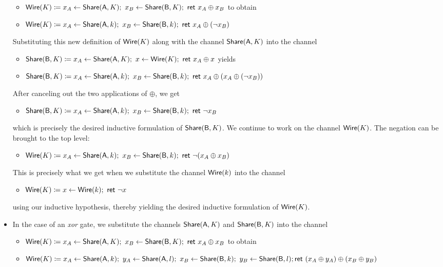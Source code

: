 \begin{itemize}
\begin{itemize}
\item $\mathsf{Wire}(K) \coloneqq x_A \leftarrow \mathsf{Share}(\mathsf{A},K); \ x_B \leftarrow \mathsf{Share}(\mathsf{B},K); \ \mathsf{ret} \ x_A \oplus x_B$ to obtain 
\item $\mathsf{Wire}(K) \coloneqq x_A \leftarrow \mathsf{Share}(\mathsf{A},k); \ x_B \leftarrow \mathsf{Share}(\mathsf{B},k); \ \mathsf{ret} \ x_A \oplus (\neg x_B)$
\end{itemize}
Substituting this new definition of $\mathsf{Wire}(K)$ along with the channel $\mathsf{Share}(\mathsf{A},K)$ into the channel
\begin{itemize}
\item $\mathsf{Share}(\mathsf{B},K) \coloneqq x_A \leftarrow \mathsf{Share}(\mathsf{A},K); \ x \leftarrow \mathsf{Wire}(K); \ \mathsf{ret} \ x_A \oplus x$ yields
\item $\mathsf{Share}(\mathsf{B},K) \coloneqq x_A \leftarrow \mathsf{Share}(\mathsf{A},k); \ x_B \leftarrow \mathsf{Share}(\mathsf{B},k); \ \mathsf{ret} \ x_A \oplus (x_A \oplus (\neg x_B))$
\end{itemize}
After canceling out the two applications of $\oplus$, we get
\begin{itemize}
\item $\mathsf{Share}(\mathsf{B},K) \coloneqq x_A \leftarrow \mathsf{Share}(\mathsf{A},k); \ x_B \leftarrow \mathsf{Share}(\mathsf{B},k); \ \mathsf{ret} \ \neg x_B$
\end{itemize}
which is precisely the desired inductive formulation of $\mathsf{Share}(\mathsf{B},K)$. We continue to work on the channel $\mathsf{Wire}(K)$. The negation can be brought to the top level:
\begin{itemize}
\item $\mathsf{Wire}(K) \coloneqq x_A \leftarrow \mathsf{Share}(\mathsf{A},k); \ x_B \leftarrow \mathsf{Share}(\mathsf{B},k); \ \mathsf{ret} \ \neg (x_A \oplus x_B)$
\end{itemize}
This is precisely what we get when we substitute the channel $\mathsf{Wire}(k)$ into the channel
\begin{itemize}
\item $\mathsf{Wire}(K) \coloneqq x \leftarrow \mathsf{Wire}(k); \ \mathsf{ret} \ \neg x$
\end{itemize}
using our inductive hypothesis, thereby yielding the desired inductive formulation of $\mathsf{Wire}(K)$.
\item In the case of an \emph{xor} gate, we substitute the channels $\mathsf{Share}(\mathsf{A},K)$ and $\mathsf{Share}(\mathsf{B},K)$ into the channel
\begin{itemize}
\item $\mathsf{Wire}(K) \coloneqq x_A \leftarrow \mathsf{Share}(\mathsf{A},K); \ x_B \leftarrow \mathsf{Share}(\mathsf{B},K); \ \mathsf{ret} \ x_A \oplus x_B$ to obtain  
\item $\mathsf{Wire}(K) \coloneqq x_A \leftarrow \mathsf{Share}(\mathsf{A},k); \ y_A \leftarrow \mathsf{Share}(\mathsf{A},l); \ x_B \leftarrow \mathsf{Share}(\mathsf{B},k); \ y_B \leftarrow \mathsf{Share}(\mathsf{B},l); \\ \mathsf{ret} \ (x_A \oplus y_A) \oplus (x_B \oplus y_B)$

\end{itemize}
\end{itemize}
